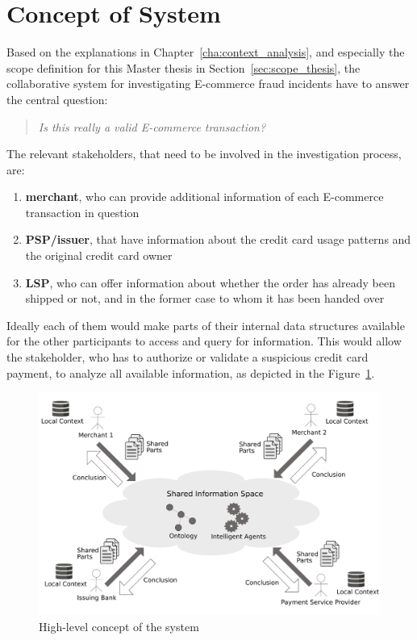 
\section{Concept of System}
\label{sec:system_concept}

Based on the explanations in Chapter~\ref{cha:context_analysis}, and especially the scope definition for this Master thesis in Section~\ref{sec:scope_thesis}, the collaborative system for investigating \gls{E-commerce} fraud incidents have to answer the central question:\@

\begin{quotation}
  \textit{Is this really a valid \gls{E-commerce} transaction?}
\end{quotation}

The relevant stakeholders, that need to be involved in the investigation process, are:\@

\begin{enumerate}
    \item \textbf{merchant}, who can provide additional information of each \gls{E-commerce} transaction in question
    \item \textbf{\gls{PSP}/issuer}, that have information about the credit card usage patterns and the original credit card owner
    \item \textbf{\gls{LSP}}, who can offer information about whether the order has already been shipped or not, and in the former case to whom it has been handed over
\end{enumerate}

Ideally each of them would make parts of their internal data structures available for the other participants to access and query for information. This would allow the stakeholder, who has to authorize or validate a suspicious credit card payment, to analyze all available information, as depicted in the Figure~\ref{fig:images_system_overview}.\@

\begin{figure}[H]
	\centering
		\includegraphics[width=0.9\columnwidth]{images/system_overview.pdf}
	\caption{High-level concept of the system}
\label{fig:images_system_overview}
\end{figure}

